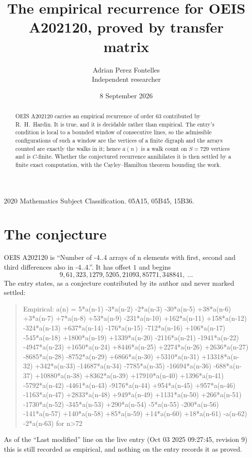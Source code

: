 \documentclass[11pt,a4paper]{article}
\title{The empirical recurrence for OEIS A202120, proved by transfer matrix}
\author{Adrian Perez Fontelles\\ \small Independent researcher}
\date{8 September 2026}
\theoremstyle{plain}
\theoremstyle{definition}
\begin{document}
\maketitle

\begin{abstract}
OEIS A202120 carries an empirical recurrence of order $63$ contributed by R.~H.~Hardin. It is
true, and it is decidable rather than empirical. The entry's condition is local to a bounded window of consecutive lines, so
the admissible configurations of such a window are the vertices of a finite digraph and the
arrays counted are exactly the walks in it; hence $a(n)$ is a walk count on $S=729$ vertices
and is $C$-finite. Whether the conjectured recurrence annihilates it is then settled by a
finite exact computation, with the Cayley--Hamilton theorem bounding the work.
\end{abstract}

\noindent\small 2020 Mathematics Subject Classification. 05A15, 05B45, 15B36.\normalsize

\section{The conjecture}

OEIS A202120 is ``Number of -4..4 arrays of n elements with first, second and third differences also in -4..4.''. It has offset $1$ and begins
\[
9, 61, 323, 1279, 5205, 21093, 85771, 348841,\ \dots
\]
The entry states, as a conjecture contributed by its author and never marked settled:
\begin{quote}
Empirical: a(n) = 5*a(n-1) -3*a(n-2) -2*a(n-3) -30*a(n-5) +38*a(n-6) +3*a(n-7) +7*a(n-8) +53*a(n-9) -231*a(n-10) +162*a(n-11) +158*a(n-12) -324*a(n-13) +637*a(n-14) -176*a(n-15) -712*a(n-16) +106*a(n-17) -545*a(n-18) +1800*a(n-19) +1339*a(n-20) -2116*a(n-21) -1941*a(n-22) -4947*a(n-23) +1650*a(n-24) +8446*a(n-25) +2274*a(n-26) +2636*a(n-27) -8685*a(n-28) -8752*a(n-29) +6866*a(n-30) +5310*a(n-31) +13318*a(n-32) +342*a(n-33) -14687*a(n-34) -7785*a(n-35) -16694*a(n-36) -688*a(n-37) +10880*a(n-38) +8362*a(n-39) +17910*a(n-40) +1396*a(n-41) -5792*a(n-42) -4461*a(n-43) -9176*a(n-44) +954*a(n-45) +957*a(n-46) -1163*a(n-47) +2833*a(n-48) +949*a(n-49) +1131*a(n-50) +266*a(n-51) -1730*a(n-52) -345*a(n-53) +290*a(n-54) -5*a(n-55) -200*a(n-56) -141*a(n-57) +140*a(n-58) +85*a(n-59) +14*a(n-60) +18*a(n-61) -a(n-62) -2*a(n-63) for n>72
\end{quote}
As of the ``Last modified'' line on the live entry (Oct 03 2025 09:27:45, revision 9) this is still
recorded as empirical, and nothing on the entry records it as proved.
\end{document}
